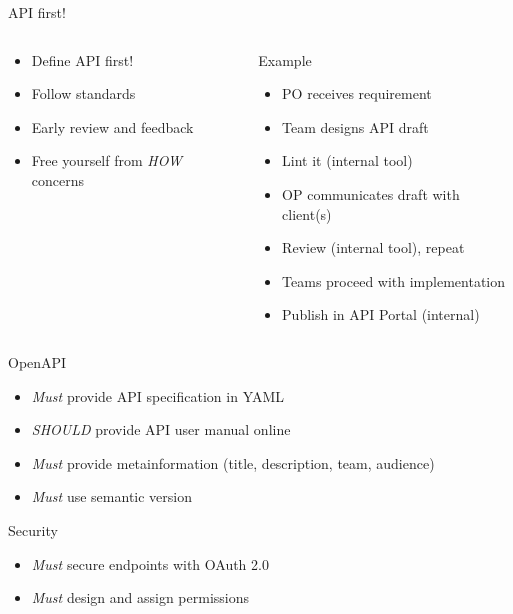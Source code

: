\documentclass[10pt]{beamer}
\begin{document}
\begin{frame}{API first!}
  \begin{columns}
   	\begin{column}{0.4\textwidth}
	  \begin{itemize}
	    \item Define API first!
		\item Follow standards
		\item Early review and feedback
		\item Free yourself from \emph{HOW} concerns
	  \end{itemize}
   	\end{column}

    \begin{column}{0.6\textwidth}
      Example
      \begin{itemize}
        \item PO receives requirement
        \item Team designs API draft
        \item Lint it (internal tool)
        \item OP communicates draft with client(s)
        \item Review (internal tool), repeat
        \item Teams proceed with implementation
        \item Publish in API Portal (internal)
     	\end{itemize}
   \end{column}
  \end{columns}

\end{frame}

\begin{frame}{OpenAPI}
  \begin{itemize}
    \item \emph{Must} provide API specification in YAML
    \item \emph{SHOULD} provide API user manual online
    \item \emph{Must} provide metainformation (title, description, team, audience)
    \item \emph{Must} use semantic version
  \end{itemize}
\end{frame}

\begin{frame}{Security}
  \begin{itemize}
    \item \emph{Must} secure endpoints with OAuth 2.0
    \item \emph{Must} design and assign permissions
  \end{itemize}
\end{frame}
\end{document}
